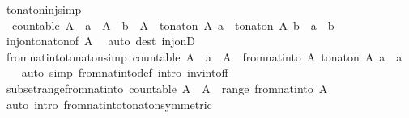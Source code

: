 \begin{isabellebody}
\endisatagproof
{\isafoldproof}%
%
\isadelimproof
\isanewline
%
\endisadelimproof
\isanewline
{}\isamarkupfalse%
\ to{\isacharunderscore}nat{\isacharunderscore}on{\isacharunderscore}inj{\isacharbrackleft}simp{\isacharbrackright}{\isacharcolon}\isanewline
\ \ {\isachardoublequoteopen}countable\ A\ {\isasymLongrightarrow}\ a\ {\isasymin}\ A\ {\isasymLongrightarrow}\ b\ {\isasymin}\ A\ {\isasymLongrightarrow}\ to{\isacharunderscore}nat{\isacharunderscore}on\ A\ a\ {\isacharequal}\ to{\isacharunderscore}nat{\isacharunderscore}on\ A\ b\ {\isasymlongleftrightarrow}\ a\ {\isacharequal}\ b{\isachardoublequoteclose}\isanewline
%
\isadelimproof
\ \ %
\endisadelimproof
%
\isatagproof
{}\isamarkupfalse%
\ inj{\isacharunderscore}on{\isacharunderscore}to{\isacharunderscore}nat{\isacharunderscore}on{\isacharbrackleft}of\ A{\isacharbrackright}\ \isamarkupfalse%
\ {\isacharparenleft}auto\ dest{\isacharcolon}\ inj{\isacharunderscore}onD{\isacharparenright}%
\endisatagproof
{\isafoldproof}%
%
\isadelimproof
\isanewline
%
\endisadelimproof
\isanewline
{}\isamarkupfalse%
\ from{\isacharunderscore}nat{\isacharunderscore}into{\isacharunderscore}to{\isacharunderscore}nat{\isacharunderscore}on{\isacharbrackleft}simp{\isacharbrackright}{\isacharcolon}\ {\isachardoublequoteopen}countable\ A\ {\isasymLongrightarrow}\ a\ {\isasymin}\ A\ {\isasymLongrightarrow}\ from{\isacharunderscore}nat{\isacharunderscore}into\ A\ {\isacharparenleft}to{\isacharunderscore}nat{\isacharunderscore}on\ A\ a{\isacharparenright}\ {\isacharequal}\ a{\isachardoublequoteclose}\isanewline
%
\isadelimproof
\ \ %
\endisadelimproof
%
\isatagproof
{}\isamarkupfalse%
\ {\isacharparenleft}auto\ simp{\isacharcolon}\ from{\isacharunderscore}nat{\isacharunderscore}into{\isacharunderscore}def\ intro{\isacharbang}{\isacharcolon}\ inv{\isacharunderscore}into{\isacharunderscore}f{\isacharunderscore}f{\isacharparenright}%
\endisatagproof
{\isafoldproof}%
%
\isadelimproof
\isanewline
%
\endisadelimproof
\isanewline
{}\isamarkupfalse%
\ subset{\isacharunderscore}range{\isacharunderscore}from{\isacharunderscore}nat{\isacharunderscore}into{\isacharcolon}\ {\isachardoublequoteopen}countable\ A\ {\isasymLongrightarrow}\ A\ {\isasymsubseteq}\ range\ {\isacharparenleft}from{\isacharunderscore}nat{\isacharunderscore}into\ A{\isacharparenright}{\isachardoublequoteclose}\isanewline
%
\isadelimproof
\ \ %
\endisadelimproof
%
\isatagproof
{}\isamarkupfalse%
\ {\isacharparenleft}auto\ intro{\isacharcolon}\ from{\isacharunderscore}nat{\isacharunderscore}into{\isacharunderscore}to{\isacharunderscore}nat{\isacharunderscore}on{\isacharbrackleft}symmetric{\isacharbrackright}{\isacharparenright}%

\end{isabellebody}
